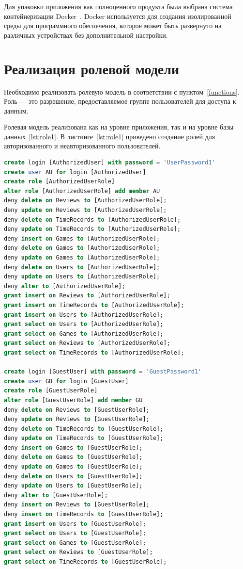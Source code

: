 Для упаковки приложения как полноценного продукта была выбрана система контейнеризации Docker~\cite{docker}. Docker используется для создания изолированной среды для программного обеспечения, которое может быть развернуто на различных устройствах без дополнительной настройки.

\section{Реализация ролевой модели}

Необходимо реализовать ролевую модель в соответствии с пунктом~\ref{functions}. Роль --- это разрешение, предоставляемое группе пользователей для доступа к данным. 

Ролевая модель реализована как на уровне приложения, так и на уровне базы данных~\ref{lst:role1}. В листинге~\ref{lst:role1} приведено создание ролей для авторизованного и неавторизованного пользователей.

\captionsetup{justification=raggedright,singlelinecheck=off}
\begin{lstlisting}[label=lst:role1, caption=Ролевая модель на уровне базы данных, language=SQL]
create login [AuthorizedUser] with password = 'UserPassword1'
create user AU for login [AuthorizedUser]
create role [AuthorizedUserRole]
alter role [AuthorizedUserRole] add member AU
deny delete on Reviews to [AuthorizedUserRole];
deny update on Reviews to [AuthorizedUserRole];
deny delete on TimeRecords to [AuthorizedUserRole];
deny update on TimeRecords to [AuthorizedUserRole];
deny insert on Games to [AuthorizedUserRole];
deny delete on Games to [AuthorizedUserRole];
deny update on Games to [AuthorizedUserRole];
deny delete on Users to [AuthorizedUserRole];
deny update on Users to [AuthorizedUserRole];
deny alter to [AuthorizedUserRole];
grant insert on Reviews to [AuthorizedUserRole];
grant insert on TimeRecords to [AuthorizedUserRole];
grant insert on Users to [AuthorizedUserRole];
grant select on Users to [AuthorizedUserRole];
grant select on Games to [AuthorizedUserRole];
grant select on Reviews to [AuthorizedUserRole];
grant select on TimeRecords to [AuthorizedUserRole];

create login [GuestUser] with password = 'GuestPassword1'
create user GU for login [GuestUser]
create role [GuestUserRole]
alter role [GuestUserRole] add member GU
deny delete on Reviews to [GuestUserRole];
deny update on Reviews to [GuestUserRole];
deny delete on TimeRecords to [GuestUserRole];
deny update on TimeRecords to [GuestUserRole];
deny insert on Games to [GuestUserRole];
deny delete on Games to [GuestUserRole];
deny update on Games to [GuestUserRole];
deny delete on Users to [GuestUserRole];
deny update on Users to [GuestUserRole];
deny alter to [GuestUserRole];
deny insert on Reviews to [GuestUserRole];
deny insert on TimeRecords to [GuestUserRole];
grant insert on Users to [GuestUserRole];
grant select on Users to [GuestUserRole];
grant select on Games to [GuestUserRole];
grant select on Reviews to [GuestUserRole];
grant select on TimeRecords to [GuestUserRole];
\end{lstlisting}

